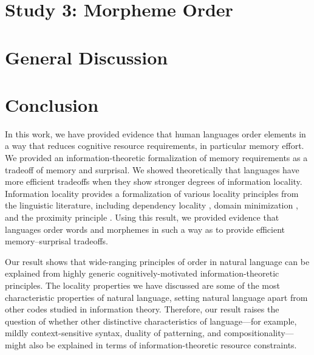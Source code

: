 \documentclass[man]{apa7}
\newcommand{\citep}{\parencite}
\begin{document}
\section{Study 3: Morpheme Order}\label{sec:morphemes}




\section{General Discussion}\label{sec:discussion}




\section{Conclusion}\label{sec:conclusion}

In this work, we have provided evidence that human languages order elements in a way that reduces cognitive resource requirements, in particular memory effort.
We provided an information-theoretic formalization of memory requirements as a tradeoff of memory and surprisal.
We showed theoretically that languages have more efficient tradeoffs when they show stronger degrees of information locality.
Information locality provides a formalization of various locality principles from the linguistic literature, including dependency locality \citep{gibson1998linguistic}, domain minimization \citep{hawkins2004efficiency}, and the proximity principle \citep{givon1985iconicity}.
Using this result, we provided evidence that languages order words and morphemes in such a way as to provide efficient memory--surprisal tradeoffs.

Our result shows that wide-ranging principles of order in natural language can be explained from highly generic cognitively-motivated information-theoretic principles. The locality properties we have discussed are some of the most characteristic properties of natural language, setting natural language apart from other codes studied in information theory.
Therefore, our result raises the question of whether other distinctive characteristics of language---for example, mildly context-sensitive syntax, duality of patterning, and compositionality---might also be explained in terms of information-theoretic resource constraints.






\printbibliography
\end{document}

